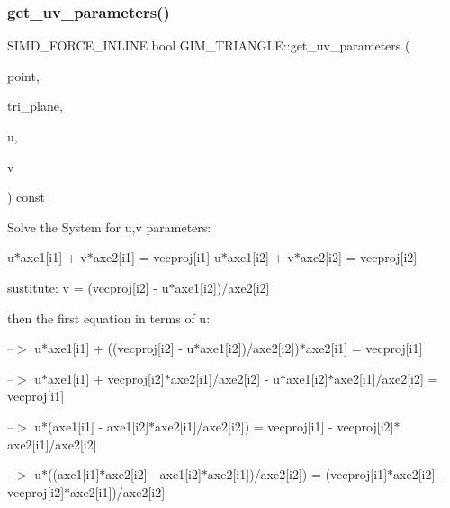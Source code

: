 \subsubsection{\texorpdfstring{get\+\_\+uv\+\_\+parameters()}{get\_uv\_parameters()}\hspace{0.1cm}{\footnotesize\ttfamily [1/2]}}
{\footnotesize\ttfamily S\+I\+M\+D\+\_\+\+F\+O\+R\+C\+E\+\_\+\+I\+N\+L\+I\+NE bool G\+I\+M\+\_\+\+T\+R\+I\+A\+N\+G\+L\+E\+::get\+\_\+uv\+\_\+parameters (\begin{DoxyParamCaption}\item[{const bt\+Vector3 \&}]{point,  }\item[{const bt\+Vector3 \&}]{tri\+\_\+plane,  }\item[{G\+R\+E\+AL \&}]{u,  }\item[{G\+R\+E\+AL \&}]{v }\end{DoxyParamCaption}) const\hspace{0.3cm}{\ttfamily [inline]}}

Solve the System for u,v parameters\+:

u$\ast$axe1\mbox{[}i1\mbox{]} + v$\ast$axe2\mbox{[}i1\mbox{]} = vecproj\mbox{[}i1\mbox{]} u$\ast$axe1\mbox{[}i2\mbox{]} + v$\ast$axe2\mbox{[}i2\mbox{]} = vecproj\mbox{[}i2\mbox{]}

sustitute\+: v = (vecproj\mbox{[}i2\mbox{]} -\/ u$\ast$axe1\mbox{[}i2\mbox{]})/axe2\mbox{[}i2\mbox{]}

then the first equation in terms of \textquotesingle{}u\textquotesingle{}\+:

--$>$ u$\ast$axe1\mbox{[}i1\mbox{]} + ((vecproj\mbox{[}i2\mbox{]} -\/ u$\ast$axe1\mbox{[}i2\mbox{]})/axe2\mbox{[}i2\mbox{]})$\ast$axe2\mbox{[}i1\mbox{]} = vecproj\mbox{[}i1\mbox{]}

--$>$ u$\ast$axe1\mbox{[}i1\mbox{]} + vecproj\mbox{[}i2\mbox{]}$\ast$axe2\mbox{[}i1\mbox{]}/axe2\mbox{[}i2\mbox{]} -\/ u$\ast$axe1\mbox{[}i2\mbox{]}$\ast$axe2\mbox{[}i1\mbox{]}/axe2\mbox{[}i2\mbox{]} = vecproj\mbox{[}i1\mbox{]}

--$>$ u$\ast$(axe1\mbox{[}i1\mbox{]} -\/ axe1\mbox{[}i2\mbox{]}$\ast$axe2\mbox{[}i1\mbox{]}/axe2\mbox{[}i2\mbox{]}) = vecproj\mbox{[}i1\mbox{]} -\/ vecproj\mbox{[}i2\mbox{]}$\ast$axe2\mbox{[}i1\mbox{]}/axe2\mbox{[}i2\mbox{]}

--$>$ u$\ast$((axe1\mbox{[}i1\mbox{]}$\ast$axe2\mbox{[}i2\mbox{]} -\/ axe1\mbox{[}i2\mbox{]}$\ast$axe2\mbox{[}i1\mbox{]})/axe2\mbox{[}i2\mbox{]}) = (vecproj\mbox{[}i1\mbox{]}$\ast$axe2\mbox{[}i2\mbox{]} -\/ vecproj\mbox{[}i2\mbox{]}$\ast$axe2\mbox{[}i1\mbox{]})/axe2\mbox{[}i2\mbox{]}

